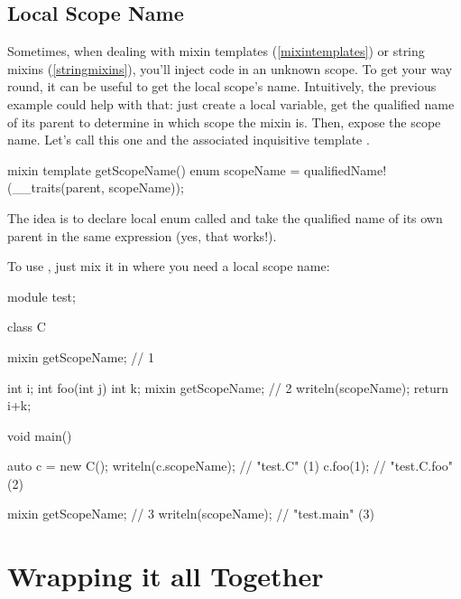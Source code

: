 \subsection{Local Scope Name}

Sometimes, when dealing with mixin templates (\ref{mixintemplates}) or string mixins (\ref{stringmixins}), you'll inject code in an unknown scope. To get your way round, it can be useful to get the local scope's name. Intuitively, the previous example could help with that: just create a local variable, get the qualified name of its parent to determine in which scope the mixin is. Then, expose the scope name. Let's call this one  and the associated inquisitive template .

\begin{dcode}
mixin template getScopeName()
{
    enum scopeName = qualifiedName!(\_\_traits(parent, scopeName));
}
\end{dcode}

The idea is to declare local enum called  and take the qualified name of its own parent in the same expression (yes, that works!).

To use , just mix it in where you need a local scope name:

\begin{dcode}
module test;

class C
{
    mixin getScopeName; // 1
    
    int i;
    int foo(int j)
    {
        int k;
        mixin getScopeName; // 2
        writeln(scopeName);
        return i+k;
    }    
}

void main()
{
    auto c = new C();
    writeln(c.scopeName); // "test.C" (1)
    c.foo(1);             // "test.C.foo" (2)
    
    mixin getScopeName; // 3
    writeln(scopeName);   // "test.main" (3)
}
\end{dcode}

\section{Wrapping it all Together}\label{wrappingitup}

